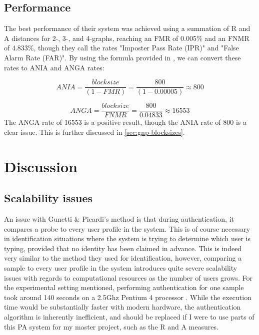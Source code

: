\documentclass[informationsecurity]{gucmasterproject}
\begin{document}
\subsection{Performance}
The best performance of their system was achieved using a summation of R and A distances for 2-, 3-, and 4-graphs, reaching an FMR of 0.005\% and an FNMR of 4.833\%, though they call the rates "Imposter Pass Rate (IPR)" and "False Alarm Rate (FAR)".
By using the formula provided in \cite{CA-performance}, we can convert these rates to ANIA and ANGA rates:

\begin{equation}
ANIA = \frac{block size}{(1-FMR)} = \frac{800}{(1-0.00005)} \approx 800
\end{equation}

\begin{equation}
ANGA = \frac{block size}{FNMR} = \frac{800}{0.04833} \approx 16553 
\end{equation}
The ANGA rate of 16553 is a positive result, though the ANIA rate of 800 is a clear issue.
This is further discussed in \cref{sec:gnp-blocksizes}.

\section{Discussion}
\subsection{Scalability issues}
\label{sec:gnp-scalability}
An issue with Gunetti \& Picardi's method is that during authentication, it compares a probe to every user profile in the system.
This is of course necessary in identification situations where the system is trying to determine which user is typing, provided that no identity has been claimed in advance.
This is indeed very similar to the method they used for identification, however, comparing a sample to every user profile in the system introduces quite severe scalability issues with regards to computational resources as the number of users grows.
For the experimental setting mentioned, performing authentication for one sample took around 140 seconds on a 2.5Ghz Pentium 4 processor \cite{gnp}. 
While the execution time would be substantially faster with modern hardware, the authentication algorithm is inherently inefficient, and should be replaced if I were to use parts of this PA system for my master project, such as the R and A measures.
\end{document}
